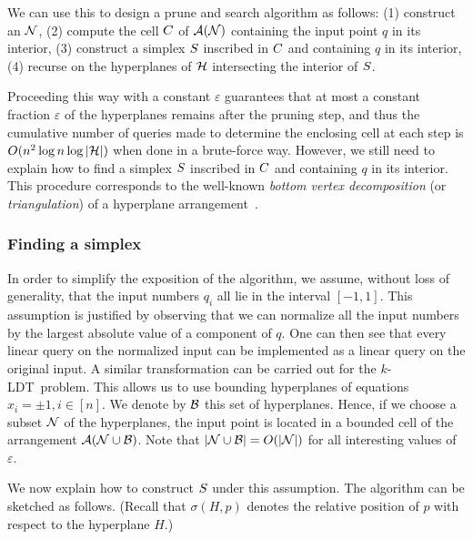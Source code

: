 We can use this to design a prune and search algorithm as follows:
(1) construct an \enet{} \(\mathcal{N}\),
(2) compute the cell \(C\) of \(\mathcal{A}(\mathcal{N})\) containing the input
point $q$ in its interior,
(3) construct a simplex \(S\) inscribed in \(C\) and containing
\(q\) in its interior,
(4) recurse on the hyperplanes of \(\mathcal{H}\) intersecting the interior of
\(S\).

Proceeding this way with a constant $\varepsilon$ guarantees that at most a
constant fraction \(\varepsilon\) of the hyperplanes remains after the pruning step,
and thus the cumulative number of queries made to determine the enclosing cell at
each step is $O(n^2 \log n \log |{\mathcal{H}}|)$ when done in a brute-force way.
However, we still need to explain how to find a simplex \(S\) inscribed
in \(C\) and containing \(q\) in its interior. This procedure corresponds to the well-known
\emph{bottom vertex decomposition} (or \emph{triangulation}) of a hyperplane
arrangement~\cite{GO04,Cla88}.

\subsubsection{Finding a simplex}

In order to simplify the exposition of the algorithm, we assume, without
loss of generality, that the input numbers $q_i$ all lie in the interval $[-1,1]$.
This assumption is justified by observing that we can normalize all the input
numbers by the largest absolute value of a component of $q$. One can then see that
every linear query on the normalized input can be implemented
as a linear query on the original input. A similar transformation can be carried out
for the \(k\)-LDT\ problem.
This allows us to use bounding hyperplanes of equations $x_i = \pm 1, i\in [n]$.
We denote by $\mathcal{B}$ this set of hyperplanes. Hence, if we choose a subset
\(\mathcal{N}\) of the hyperplanes, the input point is located in a bounded cell
of the arrangement \(\mathcal{A}(\mathcal{N} \cup \mathcal{B})\). Note that \(|{\mathcal{N} \cup
\mathcal{B}}| = O(|{\mathcal{N}}|)\) for all interesting values of \(\varepsilon\).

We now explain how to construct \(S\) under this assumption. The algorithm
can be sketched as follows. (Recall that $\sigma(H,p)$ denotes the relative position
of $p$ with respect to the hyperplane $H$.)

